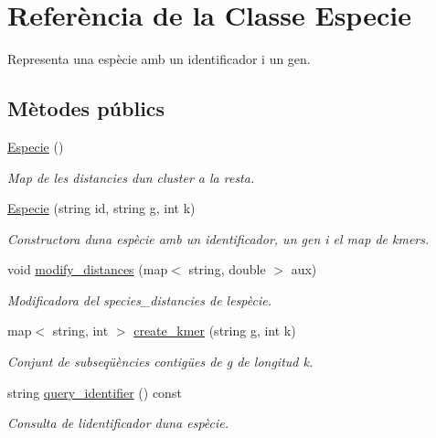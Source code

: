 \hypertarget{class_especie}{}\section{Referència de la Classe Especie}
\label{class_especie}


Representa una espècie amb un identificador i un gen.  


\subsection*{Mètodes públics}
\begin{DoxyCompactItemize}
\item 
\hyperlink{class_especie_a272c2488719cc9874b2f174906675b3d}{Especie} ()
\begin{DoxyCompactList}\small\item\em Map de les distancies d\textquotesingle{}un cluster a la resta. \end{DoxyCompactList}\item 
\hyperlink{class_especie_a00df4e464c347052383d92d310f68791}{Especie} (string id, string g, int k)
\begin{DoxyCompactList}\small\item\em Constructora d\textquotesingle{}una espècie amb un identificador, un gen i el map de kmers. \end{DoxyCompactList}\item 
void \hyperlink{class_especie_a9ac1aacc02f399f4c9c11cd8f67b0e46}{modify\+\_\+distances} (map$<$ string, double $>$ aux)
\begin{DoxyCompactList}\small\item\em Modificadora del species\+\_\+distancies de l\textquotesingle{}espècie. \end{DoxyCompactList}\item 
map$<$ string, int $>$ \hyperlink{class_especie_a7e6c7615ab5458259c1f20bcd68ebd80}{create\+\_\+kmer} (string g, int k)
\begin{DoxyCompactList}\small\item\em Conjunt de subseqüències contigües de g de longitud k. \end{DoxyCompactList}\item 
string \hyperlink{class_especie_acfce0335ac5432dc681c2931b7986ace}{query\+\_\+identifier} () const
\begin{DoxyCompactList}\small\item\em Consulta de l\textquotesingle{}identificador d\textquotesingle{}una espècie. \end{DoxyCompactList}\item 

\end{DoxyCompactItemize}

